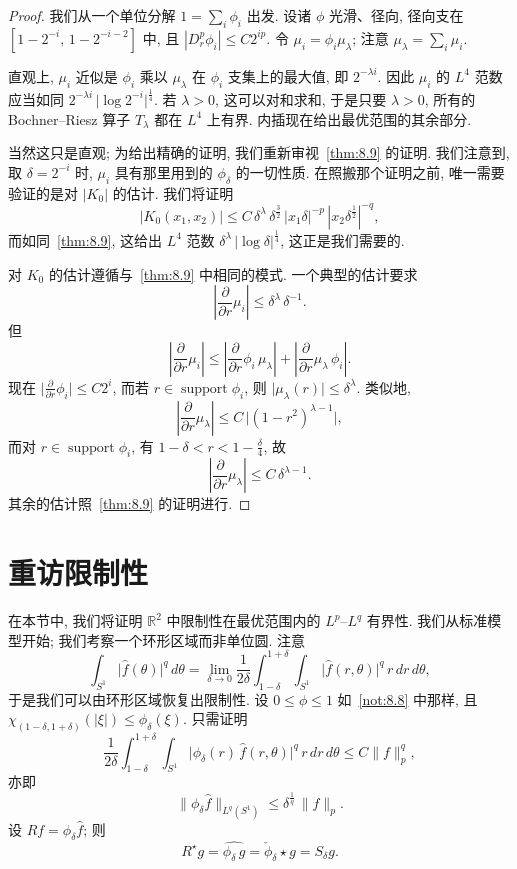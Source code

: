 \begin{proof}
我们从一个单位分解 $1=\sum_i\phi_i$ 出发. 设诸 $\phi$ 光滑、径向, 径向支在 $[1-2^{-i},\,1-2^{-i-2}]$ 中, 且 $|D_r^p\phi_i|\leq C2^{ip}$. 令 $\mu_i=\phi_i\mu_\lambda$; 注意 $\mu_\lambda=\sum_i\mu_i$.

直观上, $\mu_i$ 近似是 $\phi_i$ 乘以 $\mu_\lambda$ 在 $\phi_i$ 支集上的最大值, 即 $2^{-\lambda i}$. 因此 $\mu_i$ 的 $L^4$ 范数应当如同 $2^{-\lambda i}\,\bigl|\log 2^{-i}\bigr|^{\frac{1}{4}}$. 若 $\lambda>0$, 这可以对和求和, 于是只要 $\lambda>0$, 所有的 Bochner--Riesz 算子 $T_\lambda$ 都在 $L^4$ 上有界. 内插现在给出最优范围的其余部分.

当然这只是直观; 为给出精确的证明, 我们重新审视~\ref*{thm:8.9} 的证明. 我们注意到, 取 $\delta=2^{-i}$ 时, $\mu_i$ 具有那里用到的 $\phi_\delta$ 的一切性质. 在照搬那个证明之前, 唯一需要验证的是对 $|K_0|$ 的估计. 我们将证明
\[
|K_{0}(x_{1},x_{2})|\leq C\,\delta^{\lambda}\,\delta^{\frac{3}{2}}\,|x_{1}\delta|^{-p}\,|x_{2}\delta^{\frac{1}{2}}|^{-q},
\]
而如同~\ref*{thm:8.9}, 这给出 $L^4$ 范数 $\delta^{\lambda}\,|\log\delta|^{\frac{1}{4}}$, 这正是我们需要的.

对 $K_{0}$ 的估计遵循与~\ref*{thm:8.9} 中相同的模式. 一个典型的估计要求
\[
\left|\frac{\partial}{\partial r}\mu_{i}\right|\leq\delta^{\lambda}\,\delta^{-1}.
\]
但
\[
\left|\frac{\partial}{\partial r}\mu_{i}\right|
\leq\left|\frac{\partial}{\partial r}\phi_{i}\,\mu_{\lambda}\right|
+\left|\frac{\partial}{\partial r}\mu_{\lambda}\,\phi_{i}\right|.
\]
现在 $\bigl|\frac{\partial}{\partial r}\phi_i\bigr|\leq C2^i$, 而若 $r\in\operatorname{support}\phi_i$, 则 $\bigl|\mu_\lambda(r)\bigr|\leq\delta^\lambda$. 类似地,
\[
\left|\frac{\partial}{\partial r}\mu_{\lambda}\right|\leq C\,\bigl|(1-r^{2})^{\lambda-1}\bigr|,
\]
而对 $r\in\operatorname{support}\phi_i$, 有 $1-\delta<r<1-\frac{\delta}{4}$, 故
\[
\left|\frac{\partial}{\partial r}\mu_{\lambda}\right|\leq C\,\delta^{\lambda-1}.
\]
其余的估计照~\ref*{thm:8.9} 的证明进行.
\end{proof}

\section{重访限制性}
\label{sec:8.4}

在本节中, 我们将证明 $\mathbb{R}^2$ 中限制性在最优范围内的 $L^p$--$L^q$ 有界性. 我们从标准模型开始; 我们考察一个环形区域而非单位圆. 注意
\[
\int_{S^{1}}\bigl|\hat{f}(\theta)\bigr|^{q}\,d\theta
=\lim_{\delta\to0}\frac{1}{2\delta}\int_{1-\delta}^{1+\delta}\int_{S^{1}}\bigl|\hat{f}(r,\theta)\bigr|^{q}\,r\,dr\,d\theta,
\]
于是我们可以由环形区域恢复出限制性. 设 $0\leq\phi\leq 1$ 如~\ref*{not:8.8} 中那样, 且 $\chi_{(1-\delta,1+\delta)}(|\xi|)\leq\phi_\delta(\xi)$. 只需证明
\[
\frac{1}{2\delta}\int_{1-\delta}^{1+\delta}\int_{S^{1}}\bigl|\phi_{\delta}(r)\,\hat{f}(r,\theta)\bigr|^{q}\,r\,dr\,d\theta\leq C\|f\|_{p}^{q},
\]
亦即
\[
\bigl\|\phi_{\delta}\hat{f}\bigr\|_{L^{q}(S^{1})}\leq\delta^{\frac{1}{q}}\,\|f\|_{p}.
\]
设 $Rf=\phi_{\delta}\hat{f}$; 则
\[
R^{\star}g=\widehat{\phi_{\delta}\,g}=\check{\phi}_{\delta}\star g=S_{\delta}g.
\]


